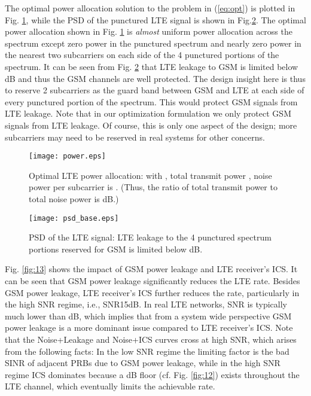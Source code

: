 \documentclass[10pt,journal]{IEEEtran}
\theoremstyle{slplain}
\begin{document}
The optimal power allocation solution to the problem in (\ref{eq:opt}) is plotted in Fig. \ref{fig:17}, while the PSD of the punctured LTE signal is shown in Fig.\ref{fig:11}. The optimal power allocation shown in Fig. \ref{fig:17} is \textit{almost} uniform power allocation across the spectrum except zero power in the punctured spectrum and nearly zero power in the nearest two subcarriers on each side of the 4 punctured portions of the  spectrum. It can be seen from Fig. \ref{fig:11}  that LTE leakage to GSM is limited below dB and thus the GSM channels are well protected. The design insight here is thus to  reserve 2 subcarriers as the guard band between GSM and LTE at each side of every punctured portion of the spectrum. This would protect GSM signals from LTE leakage. Note that in our optimization formulation we only protect GSM signals from LTE leakage. Of course, this is only one aspect of the design; more subcarriers may need to be reserved in real systems for other concerns.

\begin{figure}
\centering
\texttt{[image: power.eps]}
\caption{Optimal LTE power allocation:  with , total transmit power , noise power per subcarrier is . (Thus, the ratio of total transmit power to total noise power is dB.)  }
\label{fig:17}
\end{figure}

\begin{figure}
\centering
\texttt{[image: psd\_base.eps]}
\caption{PSD of the LTE signal: LTE leakage to the 4 punctured spectrum portions reserved for GSM is limited below dB.}
\label{fig:11}
\end{figure}


Fig. \ref{fig:13} shows the impact of GSM power leakage and LTE receiver's ICS. It can be seen that GSM power leakage  significantly reduces the LTE rate. Besides GSM power leakage, LTE receiver's ICS further reduces the rate, particularly in the high SNR regime, i.e., SNR15dB. In real LTE networks, SNR is typically much lower than dB, which implies that  from a system wide perspective GSM power leakage is a more dominant issue compared to LTE receiver's ICS. Note that the Noise+Leakage  and Noise+ICS  curves cross at high SNR, which arises from the following facts: In the low SNR regime the limiting factor is the bad SINR of adjacent PRBs due to GSM power leakage, while in the high SNR regime ICS dominates because a dB floor (cf. Fig. \ref{fig:12}) exists throughout the LTE channel, which eventually limits the achievable rate.
\end{document}

